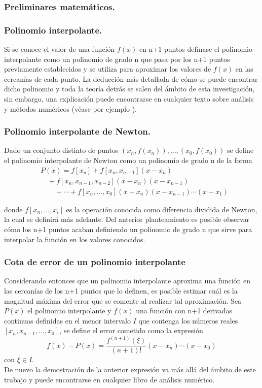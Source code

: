 \subsubsection{Preliminares matemáticos.}
\subsubsection{Polinomio interpolante.}
Si se conoce el valor de una función $f(x)$ en n+1 puntos defínase el polinomio
interpolante como un polinomio de grado n que pasa por los n+1 puntos
previamente establecidos y se utiliza para aproximar los valores de $f(x)$ en las cercanías de cada punto.
La deducción más detallada de cómo se puede encontrar dicho polinomio y toda la teoría detrás
se salen del ámbito de esta investigación, sin embargo, una explicación puede encontrarse en cualquier texto
sobre análisis y métodos numéricos (véase por ejemplo \cite{atkinson}).
\subsubsection{Polinomio interpolante de Newton.}
\begin{definition}
    \label{newton_poly}
    Dado un conjunto distinto de puntos $(x_n,f(x_n)),\ldots,(x_0,f(x_0))$ se define
    el polinomio interpolante de Newton como un polinomio de grado n de la forma
    \begin{equation}
        \begin{split}
            &P(x) =f[x_n]+f[x_n,x_{n-1}](x-x_n)\\
            &\quad +f[x_n,x_{n-1},x_{n-2}](x-x_n)(x-x_{n-1})\\
            &\qquad + \cdots + f[x_n,\ldots,x_0](x-x_n)(x-x_{n-1})\cdots(x-x_1) 
        \end{split} 
    \end{equation}  
\end{definition}
donde $f[x_n,\ldots,x_i]$ es la operación conocida como diferencia dividida de Newton,
la cual se definirá más adelante. Del anterior planteamiento es posible observar cómo
los n+1 puntos acaban definiendo un polinomio de grado n que sirve para interpolar
la función en los valores conocidos.
\subsubsection{Cota de error de un polinomio interpolante}
Considerando entonces que un polinomio interpolante aproxima una función 
en las cercanías de los n+1 puntos que lo definen, es posible estimar cuál es
la magnitud máxima del error que se comente al realizar tal aproximación. Sea $P(x)$ el
polinomio interpolante y $f(x)$ una función con n+1 derivadas continuas definidas en el menor intervalo $I$ que contenga los números reales $[x_n,x_{n-1},\ldots,x_0]$,
se define el error cometido como la expresión
\begin{equation}
    \label{lagrange_error}
    f(x)-P(x)=\frac{f^{\left(n+1\right)}(\xi)}{(n+1)!}(x-x_n)\cdots(x-x_0)
\end{equation}
con $\xi \in I$. \\De nuevo la demostración de la anterior expresión
va más allá del ámbito de este trabajo y puede encontrarse en cualquier
libro de análisis numérico.
